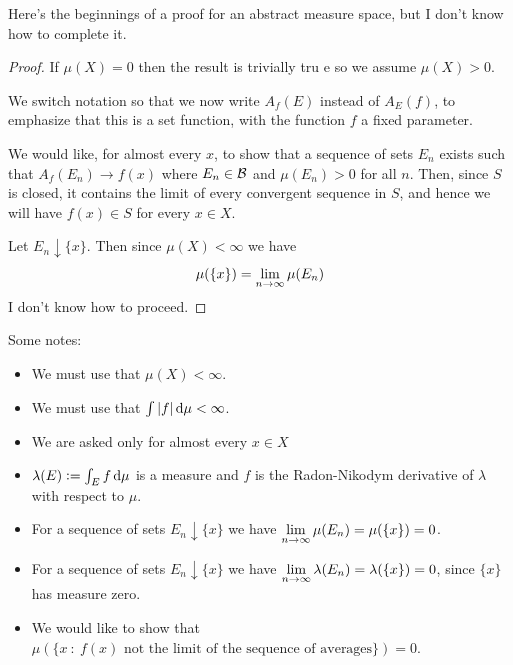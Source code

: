 Here's the beginnings of a proof for an abstract measure space, but I don't know how to complete
it.

\begin{proof}
  If $\mu(X) = 0$ then the result is trivially tru e so we assume $\mu(X) > 0$.

  We switch notation so that we now write $A_f(E)$ instead of $A_E(f)$, to emphasize that this is a
  set function, with the function $f$ a fixed parameter.

  We would like, for almost every $x$, to show that a sequence of sets $E_n$ exists such
  that $A_f(E_n) \to f(x)$ where $E_n \in \mathcal B$ and $\mu(E_n) > 0$ for all $n$. Then, since $S$ is
  closed, it contains the limit of every convergent sequence in $S$, and hence we will
  have $f(x) \in S$ for every $x \in X$.

  Let $E_n \downarrow \{x\}$. Then since $\mu(X) < \infty$ we have
  \begin{align*}
    \mu(\{x\}) = \limninf \mu(E_n)
  \end{align*}
  I don't know how to proceed.
\end{proof}

Some notes:
\begin{itemize}
\item We must use that $\mu(X) < \infty$.
\item We must use that $\int |f| \dmu < \infty$.
\item We are asked only for almost every $x \in X$
\item $\lambda(E) := \int_E f \dmu$ is a measure and $f$ is the Radon-Nikodym derivative of $\lambda$ with respect to $\mu$.
\item For a sequence of sets $E_n \downarrow \{x\}$ we have $\limninf \mu(E_n) = \mu(\{x\}) = 0$.
\item For a sequence of sets $E_n \downarrow \{x\}$ we have $\limninf \lambda(E_n) = \lambda(\{x\}) = 0$, since $\{x\}$ has measure zero.
\item We would like to show that $\mu(\{x ~:~ f(x) \text{~not the limit of the sequence of averages}\}) = 0$.
\end{itemize}





